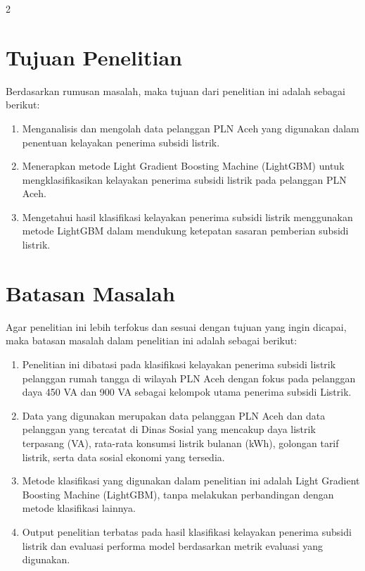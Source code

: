 \documentclass[12pt, a4paper, onecolumn, oneside]{report}
\begin{document}
\begin{spacing}{2}
\section{Tujuan Penelitian}
Berdasarkan rumusan masalah, maka tujuan dari penelitian ini adalah sebagai berikut:
\begin{enumerate}
    \item Menganalisis dan mengolah data pelanggan PLN Aceh yang digunakan dalam penentuan kelayakan penerima subsidi listrik.
    \item Menerapkan metode Light Gradient Boosting Machine (LightGBM) untuk mengklasifikasikan kelayakan penerima subsidi listrik pada pelanggan PLN Aceh.
    \item Mengetahui hasil klasifikasi kelayakan penerima subsidi listrik menggunakan metode LightGBM dalam mendukung ketepatan sasaran pemberian subsidi listrik.
\end{enumerate}

\section{Batasan Masalah}
Agar penelitian ini lebih terfokus dan sesuai dengan tujuan yang ingin dicapai, maka batasan masalah dalam penelitian ini adalah sebagai berikut:
\begin{enumerate}
    \item Penelitian ini dibatasi pada klasifikasi kelayakan penerima subsidi listrik pelanggan rumah tangga di wilayah PLN Aceh dengan fokus pada pelanggan daya 450 VA dan 900 VA sebagai kelompok utama penerima subsidi Listrik.
    \item Data yang digunakan merupakan data pelanggan PLN Aceh dan data pelanggan yang tercatat di Dinas Sosial yang mencakup daya listrik terpasang (VA), rata-rata konsumsi listrik bulanan (kWh), golongan tarif listrik, serta data sosial ekonomi yang tersedia.
    \item Metode klasifikasi yang digunakan dalam penelitian ini adalah Light Gradient Boosting Machine (LightGBM), tanpa melakukan perbandingan dengan metode klasifikasi lainnya.
    \item Output penelitian terbatas pada hasil klasifikasi kelayakan penerima subsidi listrik dan evaluasi performa model berdasarkan metrik evaluasi yang digunakan.
\end{enumerate}


\end{spacing}
\end{document}
